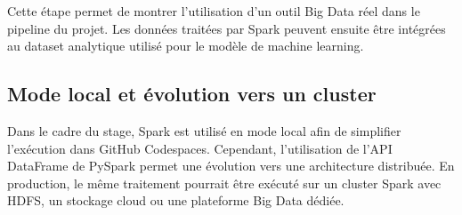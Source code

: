 Cette étape permet de montrer l'utilisation d'un outil Big Data réel dans le pipeline du projet. Les données traitées par Spark peuvent ensuite être intégrées au dataset analytique utilisé pour le modèle de machine learning.

\subsection{Mode local et évolution vers un cluster}

Dans le cadre du stage, Spark est utilisé en mode local afin de simplifier l'exécution dans GitHub Codespaces. Cependant, l'utilisation de l'API DataFrame de PySpark permet une évolution vers une architecture distribuée. En production, le même traitement pourrait être exécuté sur un cluster Spark avec HDFS, un stockage cloud ou une plateforme Big Data dédiée.
